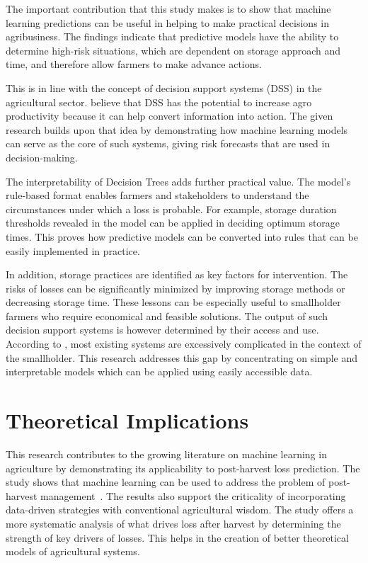 The important contribution that this study makes is to show that machine learning predictions can
be useful in helping to make practical decisions in agribusiness. The findings indicate that
predictive models have the ability to determine high-risk situations, which are dependent on storage
approach and time, and therefore allow farmers to make advance actions.

This is in line with the concept of decision support systems (DSS) in the agricultural sector.
\cite{duan2021multicriteria} believe that DSS has the potential to increase agro productivity
because it can help convert information into action. The given research builds upon that idea by
demonstrating how machine learning models can serve as the core of such systems, giving risk
forecasts that are used in decision-making.

The interpretability of Decision Trees adds further practical value. The model's rule-based format
enables farmers and stakeholders to understand the circumstances under which a loss is probable.
For example, storage duration thresholds revealed in the model can be applied in deciding optimum
storage times. This proves how predictive models can be converted into rules that can be easily
implemented in practice.

In addition, storage practices are identified as key factors for intervention. The risks of losses
can be significantly minimized by improving storage methods or decreasing storage time. These
lessons can be especially useful to smallholder farmers who require economical and feasible
solutions. The output of such decision support systems is however determined by their access and
use. According to \cite{duan2021multicriteria}, most existing systems are excessively complicated
in the context of the smallholder. This research addresses this gap by concentrating on simple and
interpretable models which can be applied using easily accessible data.


\section{Theoretical Implications}

This research contributes to the growing literature on machine learning in agriculture by
demonstrating its applicability to post-harvest loss prediction. The study shows that machine
learning can be used to address the problem of post-harvest management~\cite{jabed2024crop,meghraoui2024applied}.
The results also support the criticality of incorporating data-driven strategies with conventional
agricultural wisdom. The study offers a more systematic analysis of what drives loss after harvest
by determining the strength of key drivers of losses. This helps in the creation of better
theoretical models of agricultural systems.


